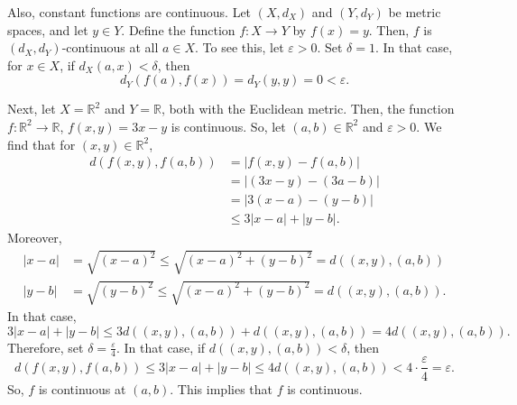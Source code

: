 \documentclass[a4paper, openany]{memoir}
\theoremstyle{definition}
\theoremstyle{plain}
\begin{document}
Also, constant functions are continuous. Let $(X, d_X)$ and $(Y, d_Y)$ be metric spaces, and let $y \in Y$. Define the function $f: X \to Y$ by $f(x) = y$. Then, $f$ is $(d_X, d_Y)$-continuous at all $a \in X$. To see this, let $\varepsilon > 0$. Set $\delta = 1$. In that case, for $x \in X$, if $d_X(a, x) < \delta$, then
\[d_Y(f(a), f(x)) = d_Y(y, y) = 0 < \varepsilon.\]

Next, let $X = \mathbb{R}^2$ and $Y = \mathbb{R}$, both with the Euclidean metric. Then, the function $f: \mathbb{R}^2 \to \mathbb{R}$, $f(x, y) = 3x - y$ is continuous. So, let $(a, b) \in \mathbb{R}^2$ and $\varepsilon > 0$. We find that for $(x, y) \in \mathbb{R}^2$,
\begin{align*}
    d(f(x, y), f(a, b)) &= |f(x, y) - f(a, b)| \\
    &= |(3x - y) - (3a - b)| \\
    &= |3(x-a) - (y-b)| \\
    &\leqslant 3|x - a| + |y - b|.
\end{align*}
Moreover,
\begin{align*}
    |x-a| &= \sqrt{(x-a)^2} \leqslant \sqrt{(x-a)^2 + (y-b)^2} = d((x, y), (a, b))\\
    |y-b| &= \sqrt{(y-b)^2} \leqslant \sqrt{(x-a)^2 + (y-b)^2} = d((x, y), (a, b)).
\end{align*}
In that case, 
\[3|x-a| + |y-b| \leqslant 3d((x, y), (a, b)) + d((x, y), (a, b)) = 4d((x, y), (a, b)).\]
Therefore, set $\delta = \frac{\varepsilon}{4}$. In that case, if $d((x, y), (a, b)) < \delta$, then 
\[d(f(x, y), f(a, b)) \leqslant 3|x-a| + |y-b| \leqslant 4d((x, y), (a, b)) < 4 \cdot \frac{\varepsilon}{4} = \varepsilon.\]
So, $f$ is continuous at $(a, b)$. This implies that $f$ is continuous.
\end{document}
